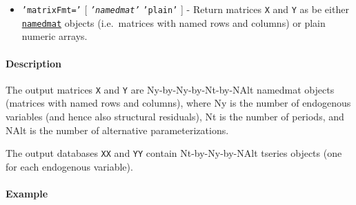 \begin{itemize}
\itemsep1pt\parskip0pt
\item
  \texttt{'matrixFmt='} {[} \emph{\texttt{'namedmat'}} \textbar{}
  \texttt{'plain'} {]} - Return matrices \texttt{X} and \texttt{Y} as be
  either \href{namedmat/Contents}{\texttt{namedmat}} objects
  (i.e.~matrices with named rows and columns) or plain numeric arrays.
\end{itemize}

\paragraph{Description}

The output matrices \texttt{X} and \texttt{Y} are Ny-by-Ny-by-Nt-by-NAlt
namedmat objects (matrices with named rows and columns), where Ny is the
number of endogenous variables (and hence also structural residuals), Nt
is the number of periods, and NAlt is the number of alternative
parameterizations.

The output databases \texttt{XX} and \texttt{YY} contain
Nt-by-Ny-by-NAlt tseries objects (one for each endogenous variable).

\paragraph{Example}


